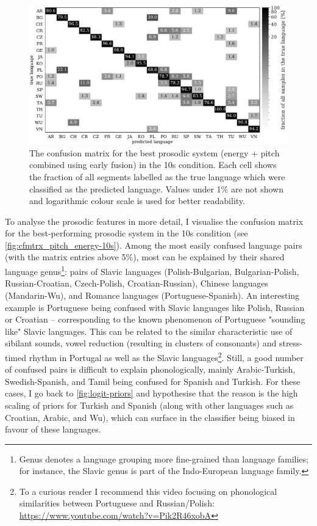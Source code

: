 \documentclass[bsc,frontabs,twoside,singlespacing,parskip,deptreport]{infthesis}
\begin{document}
{{    \begin{figure}[h!]
      \centering
      \includegraphics[width=\textwidth]{../img/cfmtrx_pitch_energy.pdf}
      \caption{The confusion matrix for the best prosodic system (energy + pitch combined using early fusion) in the 10s condition. Each cell shows the fraction of all segments labelled as the true language which were classified as the predicted language. Values under 1\% are not shown and logarithmic colour scale is used for better readability.}
      \label{fig:cfmtrx_pitch_energy-10s}
    \end{figure}

    To analyse the prosodic features in more detail, I visualise the confusion matrix for the best-performing prosodic system in the 10s condition (see \autoref{fig:cfmtrx_pitch_energy-10s}). Among the most easily confused language pairs (with the matrix entries above 5\%), most can be explained by their shared language genus\footnote{Genus denotes a language grouping more fine-grained than language families; for instance, the Slavic genus is part of the Indo-European language family.}: pairs of Slavic languages (Polish-Bulgarian, Bulgarian-Polish, Russian-Croatian, Czech-Polish, Croatian-Russian), Chinese languages (Mandarin-Wu), and Romance languages (Portuguese-Spanish). An interesting example is Portuguese being confused with Slavic languages like Polish, Russian or Croatian -- corresponding to the known phenomenon of Portuguese "sounding like" Slavic languages. This can be related to the similar characteristic use of sibilant sounds, vowel reduction (resulting in clusters of consonants) and stress-timed rhythm in Portugal as well as the Slavic languages\footnote{To a curious reader I recommend this video focusing on phonological similarities between Portuguese and Russian/Polish: \url{https://www.youtube.com/watch?v=Pik2R46xobA}}. Still, a good number of confused pairs is difficult to explain phonologically, mainly Arabic-Turkish, Swedish-Spanish, and Tamil being confused for Spanish and Turkish. For these cases, I go back to \autoref{fig:logit-priors} and hypothesise that the reason is the high scaling of priors for Turkish and Spanish (along with other languages such as Croatian, Arabic, and Wu), which can surface in the classifier being biased in favour of these languages.

}}
\end{document}
